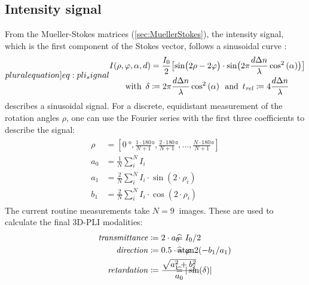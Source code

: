 \subsection{Intensity signal}\label{sec::intSignal}
%
From the Mueller-Stokes matrices (\cref{sec:MuellerStokes}), the intensity signal, which is the first component of the Stokes vector, follows a sinusoidal curve \cite{MenzelMaster,MenzelDissertation}:
%
\begin{align}
\label[pluralequation]{eq:pli_signal}
\centering
\begin{gathered}
I(\rho, \varphi, \alpha, d) =\frac{I_0}{2}\bigl[ \sin\bigl(2\rho - 2\varphi \bigr)\cdot \sin \bigl( 2\pi\frac{d \dn}{\lambda} \cos^2\left( \alpha \right) \bigr) \bigr] \\
\text{with} \enspace \delta \coloneqq 2\pi\frac{d \dn}{\lambda} \cos^2\left( \alpha \right) \enspace
\text{and} \enspace \trel \coloneqq 4 \frac{d \dn}{\lambda}
\end{gathered}
\end{align}
%
 describes a sinusoidal signal.
For a discrete, equidistant measurement of the rotation angles $\rho$, one can use the Fourier series with the first three coefficients to describe the signal:
%
\begin{align}
\begin{split}
\rho &= [\SI{0}{\degree}, \frac{1\cdot180}{N+1}\si{\degree}, \frac{2\cdot180}{N+1}\si{\degree}, ..., \frac{N\cdot180}{N+1}\si{\degree}]\\
a_0 &= \frac{1}{N} \sum_i^N I_i\\
a_1 &= \frac{2}{N} \sum_i^N I_i \cdot \sin(2 \cdot \rho_i)\\
b_1 &= \frac{2}{N} \sum_i^N I_i \cdot \cos(2 \cdot \rho_i)
\end{split}
\end{align}
%
The current routine measurements take $N=\SI{9}{}$ images.
These are used to calculate the final \ac{3D-PLI} modalities:
%
\begin{align}
\begin{split}
\mathit{transmittance} &\coloneqq 2 \cdot a_0 \vphantom{I_0/2} \\
\mathit{direction} &\coloneqq 0.5 \cdot \atantwo(-b_1 / a_1) \vphantom{\varphi} \\
\mathit{retardation} &\coloneqq \frac{\sqrt{a_1^2 + b_1^2}}{a_0}  \vphantom{\sin(\delta)}
\end{split}
\hspace{-7em}
\begin{split}
& \mathrel{\widehat{=}} I_0/2 \vphantom{2 \cdot a_0}\\
& \mathrel{\widehat{=}} \varphi \vphantom{0.5 \cdot \atantwo(-b_1 / a_1)} \\
& \mathrel{\widehat{=}} |\sin(\delta)| \vphantom{\frac{\sqrt{a_1^2 + b_1^2}}{a_0}}
\end{split}
\end{align}
